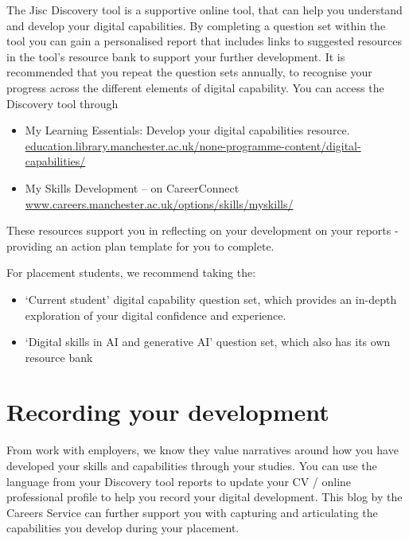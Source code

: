 \documentclass[
]{book}
\providecommand{\tightlist}{%
  \setlength{\itemsep}{0pt}\setlength{\parskip}{0pt}}
\begin{document}
The Jisc Discovery tool is a supportive online tool, that can help you understand and develop your digital capabilities. By completing a question set within the tool you can gain a personalised report that includes
links to suggested resources in the tool's resource bank to support your further development. It is recommended that you repeat the question sets annually, to recognise your progress across the different elements of digital capability. You can access the Discovery tool through

\begin{itemize}
\tightlist
\item
  My Learning Essentials: Develop your digital capabilities resource. \href{https://www.education.library.manchester.ac.uk/none-programme-content/digital-capabilities/}{education.library.manchester.ac.uk/none-programme-content/digital-capabilities/}
\item
  My Skills Development -- on CareerConnect \href{https://www.careers.manchester.ac.uk/options/skills/myskills/}{www.careers.manchester.ac.uk/options/skills/myskills/} \citep{audit}
\end{itemize}

These resources support you in reflecting on your development on your reports - providing an action plan template for you to complete.

For placement students, we recommend taking the:

\begin{itemize}
\tightlist
\item
  `Current student' digital capability question set, which provides an in-depth exploration of your digital confidence and experience.
\item
  `Digital skills in AI and generative AI' question set, which also has its own resource bank
\end{itemize}

\section{Recording your development}\label{development}

From work with employers, we know they value narratives around how you have developed your skills and capabilities through your studies. You can use the language from your Discovery tool reports to update your CV / online professional profile to help you record your digital development. This blog by the Careers Service can further support you with capturing and articulating the capabilities you develop during your placement. \citep{conway}
\end{document}
